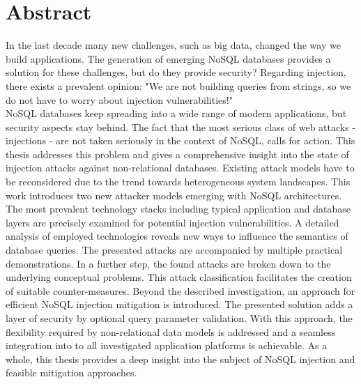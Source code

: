 \chapter*{Abstract} %
In the last decade many new challenges, such as big data, changed the way we build applications. The generation of emerging NoSQL databases provides a solution for these challenges, but do they provide security? Regarding injection, there exists a prevalent opinion: "We are not building queries from strings, so we do not have to worry about injection vulnerabilities!" \cite{MongoDB_Fundamentals:2016} \\

NoSQL databases keep spreading into a wide range of modern applications, but security aspects stay behind. The fact that the most serious class of web attacks - injections - are not taken seriously in the context of NoSQL, calls for action. This thesis addresses this problem and gives a comprehensive insight into the state of injection attacks against non-relational databases. Existing attack models have to be reconsidered due to the trend towards heterogeneous system landscapes. This work introduces two new attacker models emerging with NoSQL architectures. The most prevalent technology stacks including typical application and database layers are precisely examined for potential injection vulnerabilities. A detailed analysis of employed technologies reveals new ways to influence the semantics of database queries. The presented attacks are accompanied by multiple practical demonstrations. In a further step, the found attacks are broken down to the underlying conceptual problems. This attack classification facilitates the creation of suitable counter-measures. Beyond the described investigation, an approach for efficient NoSQL injection mitigation is introduced. The presented solution adds a layer of security by optional query parameter validation. With this approach, the flexibility required by non-relational data models is addressed and a seamless integration into to all investigated application platforms is achievable. As a whole, this thesis provides a deep insight into the subject of NoSQL injection and feasible mitigation approaches.